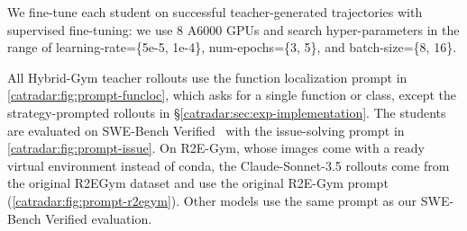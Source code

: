 We fine-tune each student on successful teacher-generated trajectories with supervised fine-tuning: we use 8 A6000 GPUs and search hyper-parameters in the range of learning-rate=\{5e-5, 1e-4\}, num-epochs=\{3, 5\}, and batch-size=\{8, 16\}.


All Hybrid-Gym teacher rollouts use the function localization prompt in \autoref{catradar:fig:prompt-funcloc}, which asks for a single function or class, except the strategy-prompted rollouts in \S\ref{catradar:sec:exp-implementation}.
The students are evaluated on SWE-Bench Verified~\cite{swebench} with the issue-solving prompt in \autoref{catradar:fig:prompt-issue}.
On R2E-Gym, whose images come with a ready virtual environment instead of conda, the Claude-Sonnet-3.5 rollouts come from the original R2EGym dataset and use the original R2E-Gym prompt~\citep{R2EGym} (\autoref{catradar:fig:prompt-r2egym}). Other models use the same prompt as our SWE-Bench Verified evaluation.


